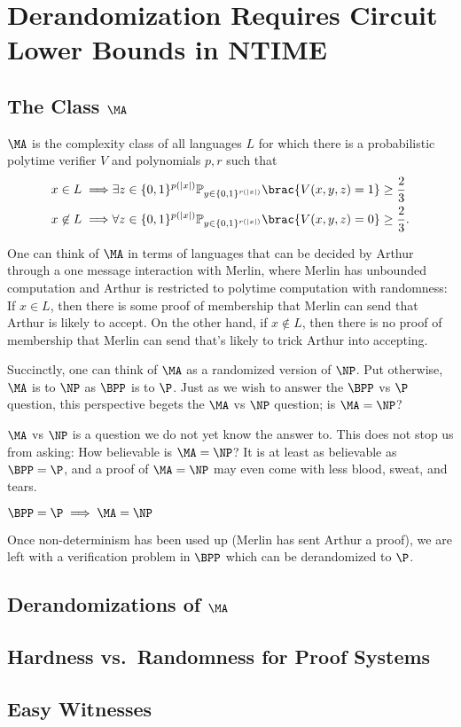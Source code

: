 \chapter{Derandomization Requires Circuit Lower Bounds in NTIME}\label{lec:11}

\section[\texorpdfstring{The Class $\MA$}{The Class MA}]{The Class $\MA$}

\begin{definition}[$\MA$]
  $\MA$ is the complexity class of all languages $L$ for which there is a probabilistic 
  polytime verifier $V$ and polynomials $p,r$ such that
  \begin{align*}
      x \in L \implies &
      \exists z \in \set{0,1}^{p(|x|)} \Pr_{y \in \set{0,1}^{r(|x|)}} \brac{V(x,y,z) = 1} \ge \frac{2}{3}
      \\
      x \not\in L \implies &
      \forall z \in \set{0,1}^{p(|x|)} \Pr_{y \in \set{0,1}^{r(|x|)}} \brac{V(x,y,z) = 0} \ge \frac{2}{3}.
  \end{align*}
\end{definition}

One can think of $\MA$ in terms of languages that can be decided by Arthur through a one 
message interaction with Merlin, where Merlin has unbounded computation and Arthur is 
restricted to polytime computation with randomness:
If $x \in L$, then there is some proof of membership that Merlin can send that Arthur is 
likely to accept.
On the other hand, if $x \not\in L$, then there is no proof of membership that Merlin can 
send that's likely to trick Arthur into accepting.

Succinctly, one can think of $\MA$ as a randomized version of $\NP$.
Put otherwise, $\MA$ is to $\NP$ as $\BPP$ is to $\P$.
Just as we wish to answer the $\BPP$ vs $\P$ question, this perspective begets the $\MA$ vs
$\NP$ question; is $\MA = \NP$?

$\MA$ vs $\NP$ is a question we do not yet know the answer to.
This does not stop us from asking:
How believable is $\MA = \NP$?
It is at least as believable as $\BPP = \P$, and a proof of $\MA = \NP$ may even come with
less blood, sweat, and tears.
\begin{lemma}
  $\BPP = \P \implies \MA = \NP$
\end{lemma}
\begin{proofsk}
  Once non-determinism has been used up (Merlin has sent Arthur a proof), we are left with
  a verification problem in $\BPP$ which can be derandomized to $\P$.
\end{proofsk}

\section[\texorpdfstring{Derandomizations of $\MA$}{Derandomizations of MA}]{Derandomizations of $\MA$}

\section{Hardness vs.\ Randomness for Proof Systems}

\section{Easy Witnesses}
